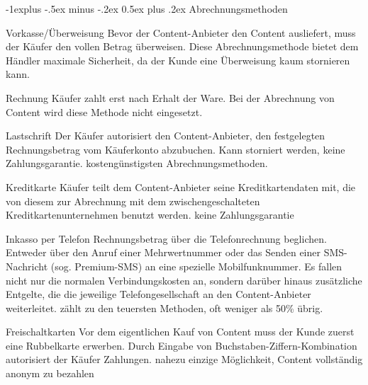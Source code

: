 \documentclass[a4paper, 8pt]{article}
\makeatletter
\renewcommand{\subsection}{\@startsection{subsection}{2}{0mm}%
                                {-1explus -.5ex minus -.2ex}%
                                {0.5ex plus .2ex}%
                                {\normalfont\normalsize\bfseries}}
\makeatother
\begin{document}
\begin{multicols*}{2}
  \subsection{Abrechnungsmethoden}
  \begin{description*}
    \item[Vorkasse/Überweisung] Bevor der Content-Anbieter den Content ausliefert, muss der Käufer den vollen Betrag überweisen. Diese Abrechnungsmethode bietet dem Händler maximale Sicherheit, da der Kunde eine Überweisung kaum stornieren kann.
    \item[Rechnung] Käufer zahlt erst nach Erhalt der Ware. Bei der Abrechnung von Content wird diese Methode nicht eingesetzt.
    \item[Lastschrift] Der Käufer autorisiert den Content-Anbieter, den festgelegten Rechnungsbetrag vom Käuferkonto abzubuchen. Kann storniert werden, keine Zahlungsgarantie. kostengünstigsten Abrechnungsmethoden.
    \item[Kreditkarte] Käufer teilt dem Content-Anbieter seine Kreditkartendaten mit, die von diesem zur Abrechnung mit dem zwischengeschalteten Kreditkartenunternehmen benutzt werden. keine Zahlungsgarantie
    \item[Inkasso per Telefon] Rechnungsbetrag über die Telefonrechnung beglichen. Entweder über den Anruf einer Mehrwertnummer oder das Senden einer SMS-Nachricht (sog. Premium-SMS) an eine spezielle Mobilfunknummer. Es fallen nicht nur die normalen Verbindungskosten an, sondern darüber hinaus zusätzliche Entgelte, die die jeweilige Telefongesellschaft an den Content-Anbieter weiterleitet. zählt zu den teuersten Methoden, oft weniger als 50\% übrig.
    \item[Freischaltkarten] Vor dem eigentlichen Kauf von Content muss der Kunde zuerst eine Rubbelkarte erwerben. Durch Eingabe von Buchstaben-Ziffern-Kombination autorisiert der Käufer Zahlungen. nahezu einzige Möglichkeit, Content vollständig anonym zu bezahlen
  \end{description*}


\end{multicols*}
\end{document}
